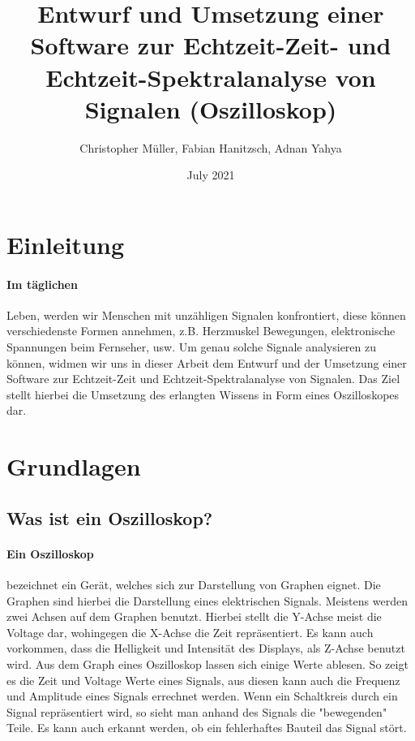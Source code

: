 \documentclass{article}
\title{Entwurf und Umsetzung einer Software zur Echtzeit-Zeit- und Echtzeit-Spektralanalyse von Signalen (Oszilloskop)}
\author{Christopher Müller, Fabian Hanitzsch, Adnan Yahya}
\date{July 2021}
\begin{document}
\maketitle
\newpage
\tableofcontents
\newpage
{}
\section{Einleitung}
\paragraph{Im täglichen}
 Leben, werden wir Menschen mit unzähligen Signalen konfrontiert, diese können verschiedenste Formen annehmen, z.B. Herzmuskel Bewegungen, elektronische Spannungen beim Fernseher, usw.
Um genau solche Signale analysieren zu können, widmen wir uns in dieser Arbeit dem Entwurf und der Umsetzung einer Software zur Echtzeit-Zeit und Echtzeit-Spektralanalyse von Signalen. Das Ziel stellt hierbei die Umsetzung des erlangten Wissens in Form eines Oszilloskopes dar.\cite{ratgeber}
\section{Grundlagen}
\subsection{Was ist ein Oszilloskop?}
\paragraph{Ein Oszilloskop}

bezeichnet ein Gerät, welches sich zur Darstellung von Graphen eignet. Die Graphen sind hierbei die Darstellung eines elektrischen Signals. Meistens werden zwei Achsen auf dem Graphen benutzt. Hierbei stellt die Y-Achse meist die Voltage dar, wohingegen die X-Achse die Zeit repräsentiert.
Es kann auch vorkommen, dass die Helligkeit und Intensität des Displays, als Z-Achse benutzt wird. Aus dem Graph eines Oszilloskop lassen sich einige Werte ablesen. So zeigt es die Zeit und Voltage Werte eines Signals, aus diesen kann auch die Frequenz und Amplitude eines Signals errechnet werden.
Wenn ein Schaltkreis durch ein Signal repräsentiert wird, so sieht man anhand des Signals die "bewegenden" Teile. Es kann auch erkannt werden, ob ein fehlerhaftes Bauteil das Signal stört.\cite{mcclurel}
\end{document}
